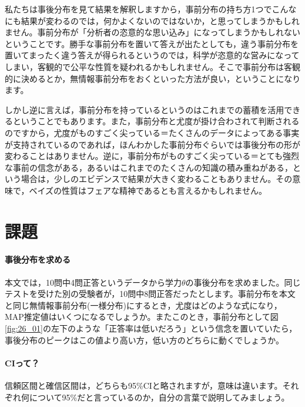\documentclass{ltjbook}
\begin{document}
私たちは事後分布を見て結果を解釈しますから，事前分布の持ち方1つでこんなにも結果が変わるのでは，何かよくないのではないか，と思ってしまうかもしれません。事前分布が「分析者の恣意的な思い込み」になってしまうかもしれないということです。勝手な事前分布を置いて答えが出たとしても，違う事前分布を置いてまったく違う答えが得られるというのでは，科学が恣意的な営みになってしまい，客観的で公平な性質を疑われるかもしれません。そこで事前分布は客観的に決めるとか，無情報事前分布をおくといった方法が良い，ということになります。

しかし逆に言えば，事前分布を持っているというのはこれまでの蓄積を活用できるということでもあります。また，事前分布と尤度が掛け合わされて判断されるのですから，尤度がものすごく尖っている＝たくさんのデータによってある事実が支持されているのであれば，ほんわかした事前分布ぐらいでは事後分布の形が変わることはありません。逆に，事前分布がものすごく尖っている＝とても強烈な事前の信念がある，あるいはこれまでのたくさんの知識の積み重ねがある，という場合は，少しのエビデンスで結果が大きく変わることもありません。その意味で，ベイズの性質はフェアな精神であるとも言えるかもしれません。
\section{課題}
\paragraph{事後分布を求める}本文では，10問中4問正答というデータから学力$\theta$の事後分布を求めました。同じテストを受けた別の受験者が，10問中8問正答だったとします。事前分布を本文と同じ無情報事前分布(一様分布)にするとき，尤度はどのような式になり，MAP推定値はいくつになるでしょうか。またこのとき，事前分布として図\ref{fig:26_01}の左下のような「正答率は低いだろう」という信念を置いていたら，事後分布のピークはこの値より高い方，低い方のどちらに動くでしょうか。
\paragraph{CIって？}信頼区間と確信区間は，どちらも95\%CIと略されますが，意味は違います。それぞれ何について95\%だと言っているのか，自分の言葉で説明してみましょう。
\end{document}
